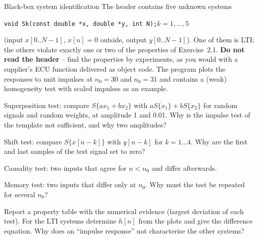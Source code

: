 \begin{exercise}{Black-box system identification}{\JSLinux}
The header  contains five unknown systems
\begin{center}\verb|void Sk(const double *x, double *y, int N);|\quad $k=1,\dots,5$\end{center}
(input
$x[0..N-1]$, $x[n]=0$ outside, output $y[0..N-1]$). One of them is LTI; the
others violate exactly one or two of the properties of Exercise~2.1.
\textbf{Do not read the header} -- find the properties by experiments, as you
would with a supplier's ECU function delivered as object code. The program
 plots the responses to unit impulses at
$n_0=30$ and $n_0=31$ and contains a (weak) homogeneity test with scaled
impulses as an example.
\begin{tasks}
  \item Superposition test: compare $S\{a x_1+b x_2\}$ with $aS\{x_1\}+bS\{x_2\}$
    for random signals and random weights, at amplitude 1 and 0.01. Why is the
    impulse test of the template not sufficient, and why two amplitudes?
  \item Shift test: compare $S\{x[n-k]\}$ with $y[n-k]$ for $k=1\dots4$. Why are
    the first and last samples of the test signal set to zero?
  \item Causality test: two inputs that agree for $n<n_0$ and differ
    afterwards.
  \item Memory test: two inputs that differ only at $n_0$. Why must the test
    be repeated for several $n_0$?
  \item Report a property table with the numerical evidence (largest deviation
    of each test). For the LTI systems determine $h[n]$ from the plots and
    give the difference equation. Why does an ``impulse response'' not
    characterise the other systems?
\end{tasks}
\end{exercise}

